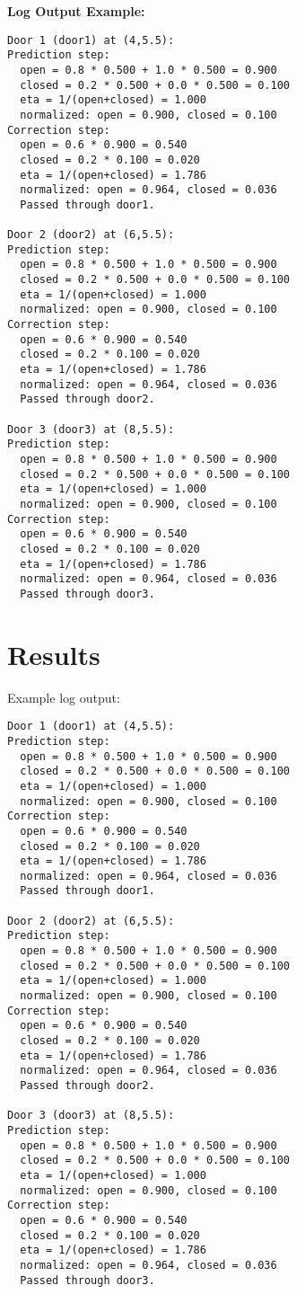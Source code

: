 \documentclass[12pt]{article}
\begin{document}
\textbf{Log Output Example:}
\begin{verbatim}
Door 1 (door1) at (4,5.5):
Prediction step:
  open = 0.8 * 0.500 + 1.0 * 0.500 = 0.900
  closed = 0.2 * 0.500 + 0.0 * 0.500 = 0.100
  eta = 1/(open+closed) = 1.000
  normalized: open = 0.900, closed = 0.100
Correction step:
  open = 0.6 * 0.900 = 0.540
  closed = 0.2 * 0.100 = 0.020
  eta = 1/(open+closed) = 1.786
  normalized: open = 0.964, closed = 0.036
  Passed through door1.

Door 2 (door2) at (6,5.5):
Prediction step:
  open = 0.8 * 0.500 + 1.0 * 0.500 = 0.900
  closed = 0.2 * 0.500 + 0.0 * 0.500 = 0.100
  eta = 1/(open+closed) = 1.000
  normalized: open = 0.900, closed = 0.100
Correction step:
  open = 0.6 * 0.900 = 0.540
  closed = 0.2 * 0.100 = 0.020
  eta = 1/(open+closed) = 1.786
  normalized: open = 0.964, closed = 0.036
  Passed through door2.

Door 3 (door3) at (8,5.5):
Prediction step:
  open = 0.8 * 0.500 + 1.0 * 0.500 = 0.900
  closed = 0.2 * 0.500 + 0.0 * 0.500 = 0.100
  eta = 1/(open+closed) = 1.000
  normalized: open = 0.900, closed = 0.100
Correction step:
  open = 0.6 * 0.900 = 0.540
  closed = 0.2 * 0.100 = 0.020
  eta = 1/(open+closed) = 1.786
  normalized: open = 0.964, closed = 0.036
  Passed through door3.
\end{verbatim}
\section{Results}
Example log output:
\begin{verbatim}
Door 1 (door1) at (4,5.5):
Prediction step:
  open = 0.8 * 0.500 + 1.0 * 0.500 = 0.900
  closed = 0.2 * 0.500 + 0.0 * 0.500 = 0.100
  eta = 1/(open+closed) = 1.000
  normalized: open = 0.900, closed = 0.100
Correction step:
  open = 0.6 * 0.900 = 0.540
  closed = 0.2 * 0.100 = 0.020
  eta = 1/(open+closed) = 1.786
  normalized: open = 0.964, closed = 0.036
  Passed through door1.

Door 2 (door2) at (6,5.5):
Prediction step:
  open = 0.8 * 0.500 + 1.0 * 0.500 = 0.900
  closed = 0.2 * 0.500 + 0.0 * 0.500 = 0.100
  eta = 1/(open+closed) = 1.000
  normalized: open = 0.900, closed = 0.100
Correction step:
  open = 0.6 * 0.900 = 0.540
  closed = 0.2 * 0.100 = 0.020
  eta = 1/(open+closed) = 1.786
  normalized: open = 0.964, closed = 0.036
  Passed through door2.

Door 3 (door3) at (8,5.5):
Prediction step:
  open = 0.8 * 0.500 + 1.0 * 0.500 = 0.900
  closed = 0.2 * 0.500 + 0.0 * 0.500 = 0.100
  eta = 1/(open+closed) = 1.000
  normalized: open = 0.900, closed = 0.100
Correction step:
  open = 0.6 * 0.900 = 0.540
  closed = 0.2 * 0.100 = 0.020
  eta = 1/(open+closed) = 1.786
  normalized: open = 0.964, closed = 0.036
  Passed through door3.
\end{verbatim}
\end{document}
